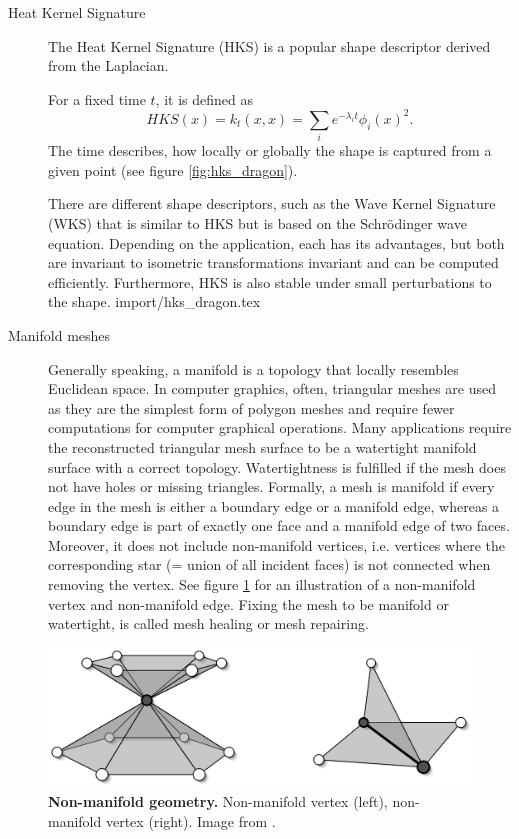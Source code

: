 \documentclass[class=article, crop=false]{standalone}
\begin{document}
\begin{description}
    \item[Heat Kernel Signature] The Heat Kernel Signature (HKS) is a popular shape descriptor derived from the Laplacian. 
    
    For a fixed time $t$, it is defined as 
    \begin{equation}
        HKS(x) = k_t(x,x) = \sum_{i} e^{-\lambda_i t}\phi_i(x)^2.
    \end{equation}
    The time describes, how locally or globally the shape is captured from a given point (see figure \ref{fig:hks_dragon}).
    
    There are different shape descriptors, such as the Wave Kernel Signature (WKS) that is similar to HKS but is based on the Schrödinger wave equation. Depending on the application, each has its advantages, but both are invariant to isometric transformations invariant and can be computed efficiently.
    Furthermore, HKS is also stable under small perturbations to the shape.
    {import/hks_dragon.tex}
    
    \item[Manifold meshes] Generally speaking, a manifold is a topology that locally resembles Euclidean space. In computer graphics, often, triangular meshes are used as they are the simplest form of polygon meshes and require fewer computations for computer graphical operations. Many applications require the reconstructed triangular mesh surface to be a watertight manifold surface with a correct topology. Watertightness is fulfilled if the mesh does not have holes or missing triangles. Formally, a mesh is manifold if every edge in the mesh is either a boundary edge or a manifold edge, whereas a boundary edge is part of exactly one face and a manifold edge of two faces. Moreover, it does not include non-manifold vertices, i.e. vertices where the corresponding star (= union of all incident faces) is not connected when removing the vertex. See figure \ref{fig:non-manif-e-v} for an illustration of a non-manifold vertex and non-manifold edge.
    Fixing the mesh to be manifold or watertight, is called mesh healing or mesh repairing.
    \end{description}
    
    
\vspace{0.05\linewidth}

\begin{figure}[h]
    \centering
    \includegraphics[width=0.4\linewidth]{thesis/appendices/import/imgs/non-manif-e-v.png}
    \caption{\textbf{Non-manifold geometry.}
\small Non-manifold vertex (left), non-manifold vertex (right). Image from \cite{Botsch2010}.
}
    \label{fig:non-manif-e-v}
\end{figure}
\vspace{0.05\linewidth}
    
\end{document}
